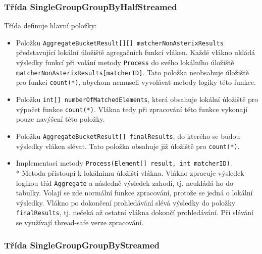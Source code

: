 \subsubsection{Třída SingleGroupGroupByHalfStreamed}

Třída definuje hlavní položky:
\begin{itemize}
\item Položku \texttt{AggregateBucketResult[][] matcherNonAsterixResults} představující lokální úložiště agregačních funkcí vláken.
Každé vlákno ukládá výsledky funkcí při volání metody \texttt{Process} do svého lokálního úložiště \texttt{matcherNonAsterixResults[matcherID]}.
Tato položka neobsahuje úložiště pro funkci \texttt{count(*)}, abychom nemuseli vyvolávat metody logiky této funkce.
\item Položku \texttt{int[] numberOfMatchedElements}, která obsahuje lokální úložiště pro výpočet funkce \texttt{count(*)}.
Vlákna tedy při zpracování této funkce vykonají pouze navýšení této položky.
\item Položku \texttt{AggregateBucketResult[] finalResults}, do kterého se budou výsledky vláken slévat.
Tato položka obsahuje již úložiště pro \texttt{count(*)}.
\item Implementaci metody \texttt{Process(Element[] result, int matcherID)}.\\*
Metoda přistoupí k lokálnímu úložišti vlákna.
Vlákno zpracuje výsledek logikou tříd \texttt{Aggregate} a následně výsledek zahodí, tj. neukládá ho do tabulky.
Volají se zde normální funkce zpracování, protože se jedná o lokální výsledky.
Vlákno po dokončení prohledávání slévá výsledky do položky \texttt{finalResults}, tj. nečeká až ostatní vlákna dokončí prohledávání.
Při slévání se využívají thread-safe verze zpracování.
\end{itemize}

\subsubsection{Třída SingleGroupGroupByStreamed}

